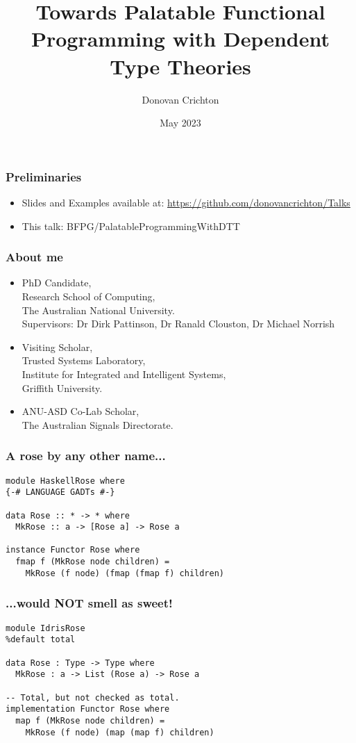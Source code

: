 \documentclass[hyperref={colorlinks = true,linkcolor = blue, citecolor = blue, urlcolor = blue}]{beamer}
\title{Towards Palatable Functional Programming with 
       Dependent Type Theories}
\author{Donovan Crichton}
\date{May 2023}
\begin{document}
 
\frame{\titlepage}

\begin{frame}[fragile]
  \frametitle{Preliminaries}
  \begin{itemize}
  \item Slides and Examples available at:
    \url{https://github.com/donovancrichton/Talks}
  \item This talk: BFPG/PalatableProgrammingWithDTT
  \end{itemize}
\end{frame}

\begin{frame}[fragile]
\frametitle{About me}
\begin{itemize}
  \item PhD Candidate, 
        \\ Research School of Computing, 
        \\ The Australian National University. \\
        \small{Supervisors: Dr Dirk Pattinson, Dr Ranald Clouston, 
               Dr Michael Norrish}
  \item Visiting Scholar, 
        \\ Trusted Systems Laboratory, 
        \\ Institute for Integrated and Intelligent Systems, 
        \\ Griffith University.
  \item ANU-ASD Co-Lab Scholar, 
        \\The Australian Signals Directorate.
\end{itemize}
\end{frame}

\begin{frame}[fragile]
  \frametitle{A rose by any other name...}
  \begin{verbatim}
module HaskellRose where
{-# LANGUAGE GADTs #-}

data Rose :: * -> * where
  MkRose :: a -> [Rose a] -> Rose a

instance Functor Rose where
  fmap f (MkRose node children) = 
    MkRose (f node) (fmap (fmap f) children)
  \end{verbatim}
\end{frame}

\begin{frame}[fragile]
  \frametitle{...would NOT smell as sweet!}
  \begin{verbatim}
module IdrisRose
%default total

data Rose : Type -> Type where
  MkRose : a -> List (Rose a) -> Rose a

-- Total, but not checked as total.
implementation Functor Rose where
  map f (MkRose node children) =
    MkRose (f node) (map (map f) children)
  \end{verbatim}
\end{frame}

\end{document}
